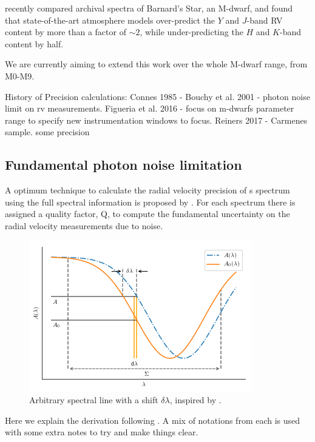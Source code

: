 \citet{artigau_optical_2018} recently compared archival spectra of Barnard's Star, an M-dwarf, and found that state-of-the-art atmosphere models over-predict the $Y$ and $J$-band RV content by more than a factor of $\sim$$2$, while under-predicting the $H$ and $K$-band content by half.

We are currently aiming to extend this work over the whole M-dwarf range, from M0-M9.


History of Precision calculations:
Connes 1985 -
Bouchy et al. 2001  - photon noise limit on rv measurements.   
Figueria et al. 2016 - focus on m-dwarfs parameter range to specify new instrumentation windows to focus.
Reiners 2017 -  Carmenes sample. some precision



\subsection{Fundamental photon noise limitation}
A optimum technique to calculate the radial velocity precision of s spectrum using the full spectral information is proposed by \citet{Connes1985}. For each spectrum there is assigned a quality factor, Q, to compute the fundamental uncertainty on the radial velocity measurements due to noise.

\begin{figure}
    \centering
    \includegraphics[width=0.7\linewidth]{figures/precision_derivation.png}
    \caption{Arbitrary spectral line with a shift $\delta \lambda$, inspired by \citet{Connes1985}.}
    \label{fig:precisionderivation}
\end{figure}

Here we explain the derivation following \citet{Connes1985, bouchy_fundamental_2001, figueira_radial_2016}. A mix of notations from each is used with some extra notes to try and make things clear.

